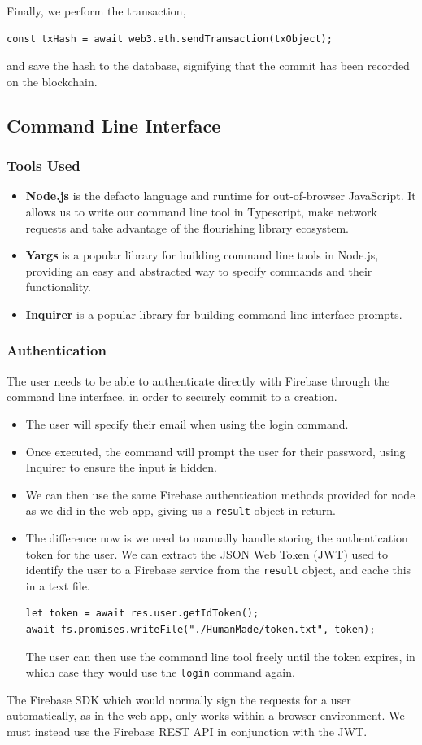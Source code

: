 \documentclass[12pt,a4paper]{article}
\begin{document}
Finally, we perform the transaction, 
\begin{lstlisting}
const txHash = await web3.eth.sendTransaction(txObject);
\end{lstlisting}
and save the hash to the database, signifying that the commit has been recorded on the blockchain.
\subsection{Command Line Interface}
\subsubsection{Tools Used}
\begin{itemize}
    \item \textbf{Node.js} is the defacto language and runtime for out-of-browser JavaScript. It allows us to write our command line tool in Typescript, make network requests and take advantage of the flourishing library ecosystem.
    \item \textbf{Yargs} is a popular library for building command line tools in Node.js, providing an easy and abstracted way to specify commands and their functionality.
    \item \textbf{Inquirer} is a popular library for building command line interface prompts.
\end{itemize}
\subsubsection{Authentication}
The user needs to be able to authenticate directly with Firebase through the command line interface, in order to securely commit to a creation.
\begin{itemize}
    \item The user will specify their email when using the login command.
    \item Once executed, the command will prompt the user for their password, using Inquirer to ensure the input is hidden.
    \item We can then use the same Firebase authentication methods provided for node as we did in the web app, giving us a \verb|result| object in return.
    \item The difference now is we need to manually handle storing the authentication token for the user. We can extract the JSON Web Token (JWT) used to identify the user to a Firebase service from the \verb|result| object, and cache this in a text file. 
    \begin{lstlisting}
let token = await res.user.getIdToken();
await fs.promises.writeFile("./HumanMade/token.txt", token);
    \end{lstlisting}
    The user can then use the command line tool freely until the token expires, in which case they would use the \verb|login| command again. 
\end{itemize}
The Firebase SDK which would normally sign the requests for a user automatically, as in the web app, only works within a browser environment. We must instead use the Firebase REST API in conjunction with the JWT.
\end{document}
